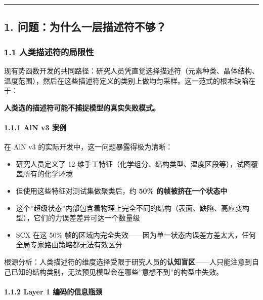 \documentclass[
  12pt,
]{ctexart}
\providecommand{\tightlist}{%
  \setlength{\itemsep}{0pt}\setlength{\parskip}{0pt}}
\begin{document}
\begin{center}\rule{0.5\linewidth}{0.5pt}\end{center}

\subsection{1.
问题：为什么一层描述符不够？}\label{ux95eeux9898ux4e3aux4ec0ux4e48ux4e00ux5c42ux63cfux8ff0ux7b26ux4e0dux591f}

\subsubsection{1.1
人类描述符的局限性}\label{ux4ebaux7c7bux63cfux8ff0ux7b26ux7684ux5c40ux9650ux6027}

现有势函数开发的共同路径：研究人员凭直觉选择描述符（元素种类、晶体结构、温度范围），然后在这些描述符定义的类别上做均匀采样。这一范式的根本缺陷在于：

\textbf{人类选的描述符可能不捕捉模型的真实失败模式。}

\paragraph{1.1.1 AlN v3 案例}\label{aln-v3-ux6848ux4f8b}

在 AlN v3 的实际开发中，这一问题暴露得极为清晰：

\begin{itemize}
\tightlist
\item
  研究人员定义了 12
  维手工特征（化学组分、结构类型、温度区段等），试图覆盖所有的化学环境
\item
  但使用这些特征对测试集做聚类后，约 \textbf{50\% 的帧被挤在一个状态中}
\item
  这个''超级状态''内部包含着物理上完全不同的结构（表面、缺陷、高应变构型），它们的力误差差异可达一个数量级
\item
  SCX 在这 50\%
  帧的区域内完全失效------因为单一状态内误差方差太大，任何全局专家路由策略都无法有效区分
\end{itemize}

根源分析：人类描述符的维度选择受限于研究人员的\textbf{认知盲区}------人只能注意到自己已知的结构类别，无法预见模型会在哪些''意想不到''的构型中失效。

\paragraph{1.1.2 Layer 1
编码的信息瓶颈}\label{layer-1-ux7f16ux7801ux7684ux4fe1ux606fux74f6ux9888}
\end{document}
